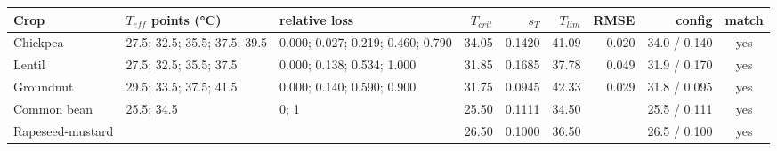 \begin{tabular}{lp{2.6cm}p{2.6cm}rrrrrc}
\toprule
Crop & $T_{eff}$ points (\si{\celsius}) & relative loss & $T_{crit}$ & $s_T$ & $T_{lim}$ & RMSE & config & match \\
\midrule
Chickpea & 27.5; 32.5; 35.5; 37.5; 39.5 & 0.000; 0.027; 0.219; 0.460; 0.790 & 34.05 & 0.1420 & 41.09 & 0.020 & 34.0 / 0.140 & yes \\
Lentil & 27.5; 32.5; 35.5; 37.5 & 0.000; 0.138; 0.534; 1.000 & 31.85 & 0.1685 & 37.78 & 0.049 & 31.9 / 0.170 & yes \\
Groundnut & 29.5; 33.5; 37.5; 41.5 & 0.000; 0.140; 0.590; 0.900 & 31.75 & 0.0945 & 42.33 & 0.029 & 31.8 / 0.095 & yes \\
Common bean & 25.5; 34.5 & 0; 1 & 25.50 & 0.1111 & 34.50 &  & 25.5 / 0.111 & yes \\
Rapeseed-mustard &  &  & 26.50 & 0.1000 & 36.50 &  & 26.5 / 0.100 & yes \\
\bottomrule
\end{tabular}

